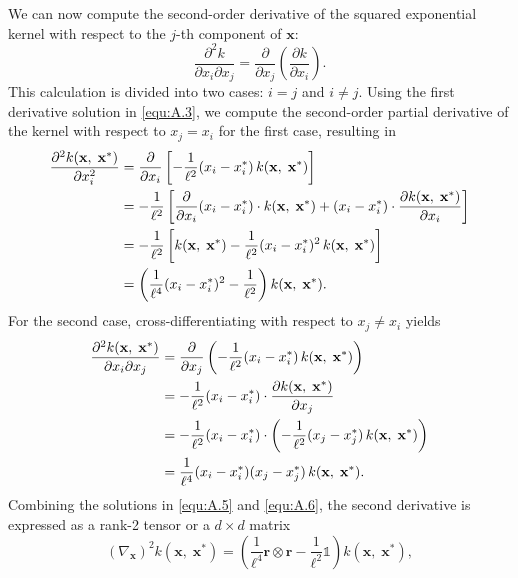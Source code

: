 We can now compute the second-order derivative of the squared exponential kernel with respect to the $j$-th component of $\mathbf{x}$:
\[
\frac{\partial^2 k}{\partial x_i \partial x_j} = \frac{\partial}{\partial x_j} \left( \frac{\partial k}{\partial x_i} \right).
\]
This calculation is divided into two cases: $i=j$ and $i\neq j$.
Using the first derivative solution in \eqref{equ:A.3}, we compute the second-order partial derivative of the kernel with respect to $x_j = x_i$ for the first case, resulting in
\begin{align} \label{equ:A.5}
\frac{\partial^2 k(\mathbf{x},\;\mathbf{x}^*)}{\partial x_i^2}
&= \frac{\partial}{\partial x_i} \left[ -\frac{1}{\ell^2} (x_i - x_i^*) \, k(\mathbf{x},\;\mathbf{x}^*) \right] \notag \\
&= -\frac{1}{\ell^2} \left[ \frac{\partial}{\partial x_i} (x_i - x_i^*) \cdot k(\mathbf{x},\;\mathbf{x}^*) + (x_i - x_i^*) \cdot \frac{\partial k(\mathbf{x},\;\mathbf{x}^*)}{\partial x_i} \right] \notag \\
&= -\frac{1}{\ell^2} \left[ k(\mathbf{x},\;\mathbf{x}^*) - \frac{1}{\ell^2} (x_i - x_i^*)^2 \, k(\mathbf{x},\;\mathbf{x}^*) \right] \notag \\
&= \left( \frac{1}{\ell^4}(x_i - x_i^*)^2 - \frac{1}{\ell^2} \right) k(\mathbf{x},\;\mathbf{x}^*).
\end{align}
For the second case, cross-differentiating with respect to $x_j \neq x_i$ yields
\begin{align} \label{equ:A.6}
\frac{\partial^2 k(\mathbf{x},\;\mathbf{x}^*)}{\partial x_i \partial x_j}
&= \frac{\partial}{\partial x_j} \left( -\frac{1}{\ell^2} (x_i - x_i^*) \, k(\mathbf{x},\;\mathbf{x}^*) \right) \notag \\
&= -\frac{1}{\ell^2} (x_i - x_i^*) \cdot \frac{\partial k(\mathbf{x},\;\mathbf{x}^*)}{\partial x_j} \notag \\
&= -\frac{1}{\ell^2} (x_i - x_i^*) \cdot \left( -\frac{1}{\ell^2} (x_j - x_j^*) \, k(\mathbf{x},\;\mathbf{x}^*) \right) \notag \\
&= \frac{1}{\ell^4} (x_i - x_i^*)(x_j - x_j^*) \, k(\mathbf{x},\;\mathbf{x}^*).
\end{align}
Combining the solutions in \eqref{equ:A.5} and \eqref{equ:A.6}, the second derivative is expressed as a rank-2 tensor or a $d\times d$ matrix
\begin{equation}  \label{equ:A.7}
\boxed{
(\nabla_{\mathbf{x}})^{2} k(\mathbf{x},\;\mathbf{x}^*) = 
\left( \frac{1}{\ell^4} \mathbf{r} \otimes \mathbf{r}
- \frac{1}{\ell^2} \mathbb{1} \right) k(\mathbf{x},\;\mathbf{x}^*),
}
\end{equation}
